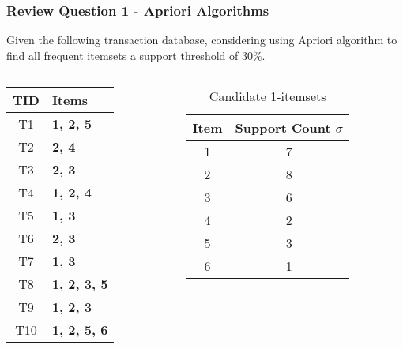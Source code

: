 \documentclass[aspectratio=169, 10pt]{beamer}
\begin{document}
\begin{frame}[t]
\frametitle{Review Question 1 - Apriori Algorithms}
\small

Given the following transaction database, considering using Apriori algorithm to find all frequent itemsets a support threshold of 30\%.

\begin{columns}
    \begin{column}{0.5\textwidth} 
        \begin{table}[]
            \begin{tabular}{c|l}
            TID & \textbf{Items}      \\ \hline
            T1   & \textbf{1, 2, 5}    \\
            T2   & \textbf{2, 4}       \\
            T3   & \textbf{2, 3}       \\
            T4   & \textbf{1, 2, 4}    \\
            T5   & \textbf{1, 3}       \\
            T6   & \textbf{2, 3}       \\
            T7   & \textbf{1, 3}       \\
            T8   & \textbf{1, 2, 3, 5} \\
            T9   & \textbf{1, 2, 3}    \\
            T10  & \textbf{1, 2, 5, 6}
            \end{tabular}
        \end{table}
    \end{column}
    \begin{column}{0.5\textwidth} %

        \begin{table}[]
            \caption{Candidate 1-itemsets}
            \begin{tabular}{c|c}
            Item                     & Support Count $\sigma$           \\ \hline
            1                        & 7                        \\
            2                        & 8                        \\
            3                        & 6                        \\
            {\color[HTML]{FE0000} 4} & {\color[HTML]{FE0000} 2} \\
            5                        & 3                        \\
            {\color[HTML]{FE0000} 6} & {\color[HTML]{FE0000} 1}
            \end{tabular}
        \end{table}
        

\end{column}
\end{columns}
\end{frame}
\end{document}
